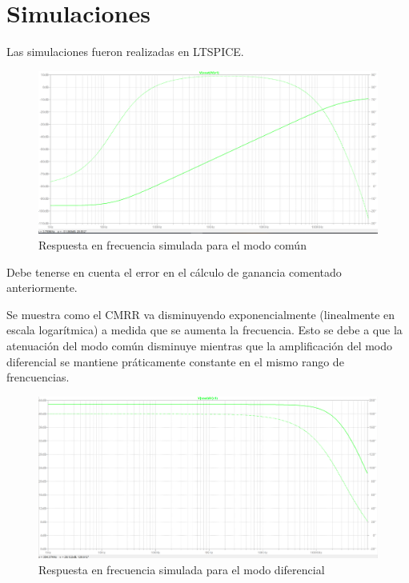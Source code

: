 \documentclass[../../tc_tp3_main.tex]{subfiles}
\begin{document}
\section{Simulaciones}
Las simulaciones fueron realizadas en LTSPICE.
	\begin{figure}[h!]	
		\centering
		\includegraphics[scale=0.3]{imagenes/bode_comun_simulado.png}
		\caption{Respuesta en frecuencia simulada para el modo común}
		\label{fig:ej5_bode_diferencial_simulado}
	\end{figure}

Debe tenerse en cuenta el error en el cálculo de ganancia comentado anteriormente.\par
Se muestra como el CMRR va disminuyendo exponencialmente (linealmente en escala logarítmica) a medida que se aumenta la frecuencia. Esto se debe a que la atenuación del modo común disminuye mientras que la amplificación del modo diferencial se mantiene práticamente constante en el mismo rango de frencuencias.\par

	\begin{figure}[h!]	
		\centering
		\includegraphics[scale=0.3]{imagenes/bode_diferencial_simulado.png}
		\caption{Respuesta en frecuencia simulada para el modo diferencial}
		\label{fig:ej5_bode_diferencial_simulado}
	\end{figure}
	
\end{document}

